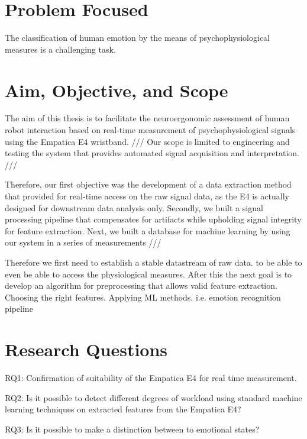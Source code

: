 \section{Problem Focused}
The classification of human emotion by the means of psychophysiological measures is a challenging task.
\section{Aim, Objective, and Scope}
The aim of this thesis is to facilitate the neuroergonomic assessment of human robot interaction based on real-time measurement of psychophysiological signals using the Empatica E4 wristband. 
///
Our scope is limited to engineering and testing the system that provides automated signal acquisition and interpretation. 
///

Therefore, our first objective was the development of a data extraction method that provided for real-time access on the raw signal data, as the E4 is actually designed for downstream data analysis only.
Secondly, we built a signal processing pipeline that compensates for artifacts while upholding signal integrity for feature extraction.
Next, we built a database for machine learning by using our system in a series of measurements  
///

Therefore we first need to establish a stable datastream of raw data. to be able to even  be able to access the physiological measures.
After this the next goal is to develop an algorithm for preprocessing that allows valid feature extraction.
Choosing the right features.
Applying ML methods. i.e. emotion recognition pipeline

\section{Research Questions}
RQ1: Confirmation of suitability of the Empatica E4 for real time measurement.

RQ2: Is it possible to detect different degrees of workload using standard machine learning techniques on extracted features from the Empatica E4?

RQ3: Is it possible to make a distinction between to emotional states?

